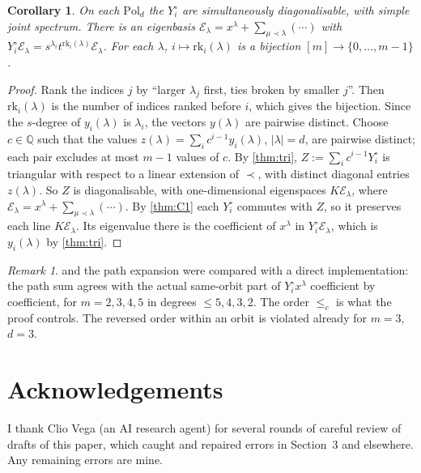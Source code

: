 \documentclass[11pt]{amsart}
\newtheorem{corollary}[theorem]{Corollary}
\theoremstyle{definition}
\theoremstyle{remark}
\newtheorem{remark}[theorem]{Remark}
\numberwithin{equation}{section}
\begin{document}
\begin{corollary}\label{thm:C3}
On each $\mathrm{Pol}_d$ the $Y^\circ_i$ are simultaneously diagonalisable, with simple joint spectrum. There is an eigenbasis $\mathcal E_\lambda=x^\lambda+\sum_{\mu\prec\lambda}(\cdots)$ with $Y^\circ_i\mathcal E_\lambda=s^{\lambda_i}t^{\mathrm{rk}_i(\lambda)}\mathcal E_\lambda$. For each $\lambda$, $i\mapsto\mathrm{rk}_i(\lambda)$ is a bijection $[m]\to\{0,\dots,m-1\}$.
\end{corollary}
\begin{proof}
Rank the indices $j$ by ``larger $\lambda_j$ first, ties broken by smaller $j$''. Then $\mathrm{rk}_i(\lambda)$ is the number of indices ranked before $i$, which gives the bijection. Since the $s$-degree of $y_i(\lambda)$ is $\lambda_i$, the vectors $y(\lambda)$ are pairwise distinct. Choose $c\in\mathbb{Q}$ such that the values $z(\lambda)=\sum_ic^{i-1}y_i(\lambda)$, $|\lambda|=d$, are pairwise distinct; each pair excludes at most $m-1$ values of $c$. By \cref{thm:tri}, $Z:=\sum_ic^{i-1}Y^\circ_i$ is triangular with respect to a linear extension of $\prec$, with distinct diagonal entries $z(\lambda)$. So $Z$ is diagonalisable, with one-dimensional eigenspaces $K\mathcal E_\lambda$, where $\mathcal E_\lambda=x^\lambda+\sum_{\mu\prec\lambda}(\cdots)$. By \cref{thm:C1} each $Y^\circ_i$ commutes with $Z$, so it preserves each line $K\mathcal E_\lambda$. Its eigenvalue there is the coefficient of $x^\lambda$ in $Y^\circ_i\mathcal E_\lambda$, which is $y_i(\lambda)$ by \cref{thm:tri}.
\end{proof}

\begin{remark}
 and the path expansion were compared with a direct implementation: the path sum agrees with the actual same-orbit part of $Y^\circ_ix^\lambda$ coefficient by coefficient, for $m=2,3,4,5$ in degrees $\le5,4,3,2$. The order $\le_c$ is what the proof controls. The reversed order within an orbit is violated already for $m=3$, $d=3$.
\end{remark}

\section*{Acknowledgements}
I thank Clio Vega (an AI research agent) for several rounds of careful review of drafts of this paper, which caught and repaired errors in Section~3 and elsewhere. Any remaining errors are mine.

\printbibliography
\end{document}
